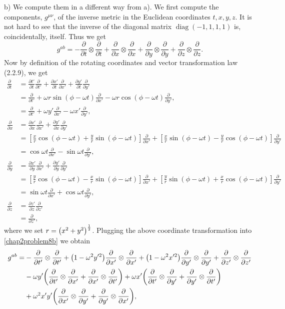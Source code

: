 \documentclass{note}
\numberwithin{equation}{chapter}
\newcommand{\pdv}[2]{\frac{\partial #1}{\partial #2}}
\begin{document}
b) We compute them in a different way from a). We first compute the components,
$g^{\mu\nu}$, of the inverse metric in the Euclidean coordinates $t, x, y, z$. It is
not hard to see that the inverse of the diagonal matrix $\operatorname{diag}(-1, 1,
1, 1)$ is, coincidentally, itself. Thus we get
\begin{equation}
  g^{ab} = - \pdv{}{t}\otimes\pdv{}{t} + \pdv{}{x}\otimes\pdv{}{x} +
  \pdv{}{y}\otimes\pdv{}{y} + \pdv{}{z}\otimes\pdv{}{z}. \label{chap2problem8b}
\end{equation}
Now by definition of the rotating coordinates and vector transformation law (2.2.9),
we get
\begin{align*}
  \pdv{}{t}
   & = \pdv{t'}{t}\pdv{}{t'} + \pdv{x'}{t}\pdv{}{x'} + \pdv{y'}{t}\pdv{}{y'} \\
   & = \pdv{}{t'} + \omega r\sin(\phi-\omega t)\pdv{}{x'}
  - \omega r\cos(\phi-\omega t)\pdv{}{y'},                                   \\
   & = \pdv{}{t'} + \omega y'\pdv{}{x'} - \omega x'\pdv{}{y'},               \\
  \pdv{}{x}
   & = \pdv{x'}{x}\pdv{}{x'} + \pdv{y'}{x}\pdv{}{y'}                         \\
   & = \left[\frac{x}{r}\cos(\phi-\omega t) + \frac{y}{r}\sin(\phi-\omega t)
    \right]\pdv{}{x'} + \left[\frac{x}{r}\sin(\phi-\omega t) -
  \frac{y}{r}\cos(\phi-\omega t)\right]\pdv{}{y'}                            \\
   & = \cos\omega t\pdv{}{x'} - \sin\omega t\pdv{}{y'},                      \\
  \pdv{}{y}
   & = \pdv{x'}{y}\pdv{}{x'} + \pdv{y'}{y}\pdv{}{y'}                         \\
   & = \left[\frac{y}{r}\cos(\phi-\omega t) - \frac{x}{r}\sin(\phi-\omega t)
    \right]\pdv{}{x'} + \left[\frac{y}{r}\sin(\phi-\omega t) +
  \frac{x}{r}\cos(\phi-\omega t)\right]\pdv{}{y'}                            \\
   & = \sin\omega t\pdv{}{x'} + \cos\omega t\pdv{}{y'},                      \\
  \pdv{}{z}
   & = \pdv{z'}{z}\pdv{}{z'}                                                 \\
   & = \pdv{}{z'},
\end{align*}
where we set $r = \prn{x^2+y^2}^{\frac12}$. Plugging the above coordinate
transformation into \eqref{chap2problem8b} we obtain
\begin{align*}
  g^{ab} =
   & - \pdv{}{t'}\otimes\pdv{}{t'} + \prn{1-\omega^2y'^2}\pdv{}{x'}
  \otimes\pdv{}{x'} + \prn{1-\omega^2x'^2}\pdv{}{y'}\otimes\pdv{}{y'} +
  \pdv{}{z'}\otimes\pdv{}{z'}                                        \\
   & - \omega y'\prn{\pdv{}{t'}\otimes\pdv{}{x'} + \pdv{}{x'}\otimes
    \pdv{}{t'}} + \omega x'\prn{\pdv{}{t'}\otimes\pdv{}{y'} +
  \pdv{}{y'}\otimes\pdv{}{t'}}                                       \\
   & + \omega^2x'y'\prn{\pdv{}{x'}\otimes\pdv{}{y'} +
    \pdv{}{y'}\otimes\pdv{}{x'}},
\end{align*}
\end{document}
